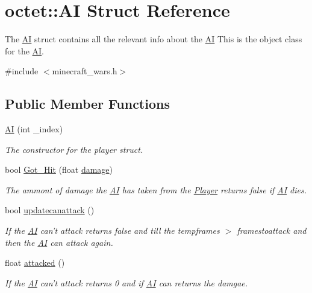 \hypertarget{structoctet_1_1_a_i}{\section{octet\+:\+:A\+I Struct Reference}
\label{structoctet_1_1_a_i}
}


The \hyperlink{structoctet_1_1_a_i}{A\+I} struct contains all the relevant info about the \hyperlink{structoctet_1_1_a_i}{A\+I} This is the object class for the \hyperlink{structoctet_1_1_a_i}{A\+I}.  




{\ttfamily \#include $<$minecraft\+\_\+wars.\+h$>$}

\subsection*{Public Member Functions}
\begin{DoxyCompactItemize}
\item 
\hyperlink{structoctet_1_1_a_i_af1ba740c2468f2561f339276775b1083}{A\+I} (int \+\_\+index)
\begin{DoxyCompactList}\small\item\em The constructor for the player struct. \end{DoxyCompactList}\item 
bool \hyperlink{structoctet_1_1_a_i_a07f1fe660302de694477627f95c58f56}{Got\+\_\+\+Hit} (float \hyperlink{structoctet_1_1_a_i_a1d0e4f22af8d053827acec1f42cf0f41}{damage})
\begin{DoxyCompactList}\small\item\em The ammont of damage the \hyperlink{structoctet_1_1_a_i}{A\+I} has taken from the \hyperlink{structoctet_1_1_player}{Player} returns false if \hyperlink{structoctet_1_1_a_i}{A\+I} dies. \end{DoxyCompactList}\item 
bool \hyperlink{structoctet_1_1_a_i_a0e1e1d57a6ea0cc3189bed8cc87ef16a}{updatecanattack} ()
\begin{DoxyCompactList}\small\item\em If the \hyperlink{structoctet_1_1_a_i}{A\+I} can't attack returns false and till the tempframes $>$ framestoattack and then the \hyperlink{structoctet_1_1_a_i}{A\+I} can attack again. \end{DoxyCompactList}\item 
float \hyperlink{structoctet_1_1_a_i_a009c0ba8d9eb8ad009772e5fc755aff7}{attacked} ()
\begin{DoxyCompactList}\small\item\em If the \hyperlink{structoctet_1_1_a_i}{A\+I} can't attack returns 0 and if \hyperlink{structoctet_1_1_a_i}{A\+I} can returns the damgae. \end{DoxyCompactList}\end{DoxyCompactItemize}
